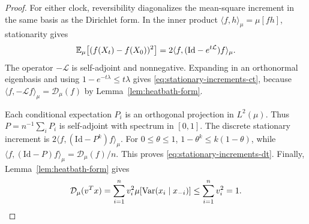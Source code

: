 \begin{proof}
For either clock, reversibility diagonalizes the mean-square
increment in the same basis as the Dirichlet form. In the inner product
$\langle f,h\rangle_\mu=\mu[fh]$, stationarity gives
\[
 \mathbb E_\mu\bigl[(f(X_t)-f(X_0))^2\bigr]
 =2\langle f,(\mathrm{Id}-e^{t\mathcal L})f\rangle_\mu.
\]
The operator $-\mathcal L$ is self-adjoint and nonnegative.  Expanding in
an orthonormal eigenbasis and using $1-e^{-t\lambda}\le t\lambda$ gives
\eqref{eq:stationary-increments-ct}, because
$\langle f,-\mathcal Lf\rangle_\mu=\mathcal D_\mu(f)$ by
Lemma~\ref{lem:heatbath-form}.

Each conditional expectation $P_i$ is an orthogonal projection in
$L^2(\mu)$.  Thus $P=n^{-1}\sum_iP_i$ is self-adjoint with spectrum in
$[0,1]$.  The discrete stationary increment is
$2\langle f,(\mathrm{Id}-P^k)f\rangle_\mu$.
For $0\le\theta\le1$, $1-\theta^k\le k(1-\theta)$, while
$\langle f,(\mathrm{Id}-P)f\rangle_\mu=\mathcal D_\mu(f)/n$.
This proves \eqref{eq:stationary-increments-dt}.
Finally, Lemma~\ref{lem:heatbath-form} gives
\[
 \mathcal D_\mu(v^Tx)
 =\sum_{i=1}^n v_i^2\mu[\operatorname{Var}(x_i\mid x_{-i})]
 \le\sum_{i=1}^n v_i^2=1.
\]
\end{proof}

